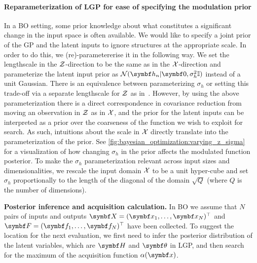 \paragraph{Reparameterization of LGP for ease of specifying the modulation prior}
In a BO setting, some prior knowledge about what constitutes a significant change in the input space is often available.
We would like to specify a joint prior of the GP and the latent inputs to ignore structures at the appropriate scale.
In order to do this, we (re)-parametererise it in the following way.
We set the lengthscale in the $\mathcal{Z}$-direction to be the same as in the $\mathcal{X}$-direction and parameterize the latent input prior as $\mathcal{N}(\mat{h}_n|\mat{0}, \sigma_h^2\mathbb{I})$ instead of a unit Gaussian.
There is an equivalence between parameterizing $\sigma_h$ or setting this trade-off via a separate lengthscale for $\mathcal{Z}$ as in~\parencite{wang_gaussian_2012}.
However, by using the above parameterization there is a direct correspondence in covariance reduction from moving an observation in $\mathcal{Z}$ as in $\mathcal{X}$, and the prior for the latent inputs can be interpreted as a prior over the coarseness of the function we wish to exploit for search.
As such, intuitions about the scale in $\mathcal{X}$ directly translate into the parameterization of the prior.
See \cref{fig:bayesian_optimization:varying_z_sigma} for a visualization of how changing $\sigma_h$ in the prior affects the modulated function posterior.
To make the $\sigma_h$ parameterization relevant across input sizes and dimensionalities,
we rescale the input domain $\mathcal{X}$ to be a unit hyper-cube and set $\sigma_h$ proportionally to the length of the diagonal of the domain $\sqrt{Q}$ (where $Q$ is the number of dimensions).

\textbf{Posterior inference and acquisition calculation.}
In BO we assume that $N$ pairs of inputs and outputs $\mat{X} = (\mat{x}_1, \ldots, \mat{x}_N)^\top$ and $\mat{F} = (\mat{f}_1, \ldots, \mat{f}_N)^\top$ have been collected.
To suggest the location for the next evaluation, we first need to infer the posterior distribution of the latent variables, which are $\mat{H}$ and $\mat{\theta}$ in LGP, and then search for the maximum of the acquisition function $\alpha(\mat{x})$.

